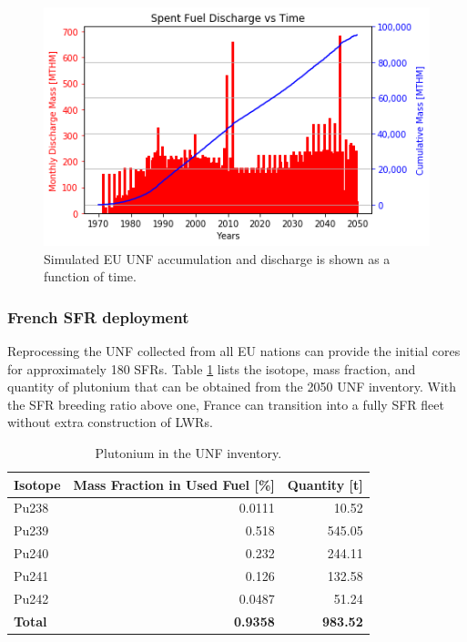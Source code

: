 \begin{figure}[htbp!]
    \begin{center}
            \includegraphics[scale=0.7]{./images/eu_future/snf_discharge.png}
    \end{center}
        \caption{Simulated \gls{EU} \gls{UNF} accumulation and discharge is 
shown as a function of time.}
    \label{fig:eu_snf}
\end{figure}


\FloatBarrier
\subsubsection{French \gls{SFR} deployment}


Reprocessing the \gls{UNF} collected from all EU nations can provide the 
initial cores for approximately 180 \glspl{SFR}. Table \ref{tab:pu} lists the 
isotope, mass fraction, and quantity of plutonium that can be obtained from the 
2050 \gls{UNF} inventory.  With the \gls{SFR} breeding ratio above one, France 
can transition into a fully \gls{SFR} fleet without extra construction of 
\glspl{LWR}. 

\begin{table}[h]
    \centering
    \caption{Plutonium in the \gls{UNF} inventory.}
    \begin{tabular}{lrr}
        \hline
        \textbf{Isotope} & \textbf{Mass Fraction in Used Fuel [\%]} & \textbf{Quantity [t]} \\ \hline
        Pu238 & 0.0111 & 10.52 \\ 
        Pu239 & 0.518 & 545.05 \\ 
        Pu240 & 0.232 & 244.11 \\ 
        Pu241 & 0.126 & 132.58 \\ 
        Pu242 & 0.0487 & 51.24 \\ \hline
        \textbf{Total} & \textbf{0.9358} & \textbf{983.52} \\ \hline
    \end{tabular}
    
    \label{tab:pu}
\end{table}


